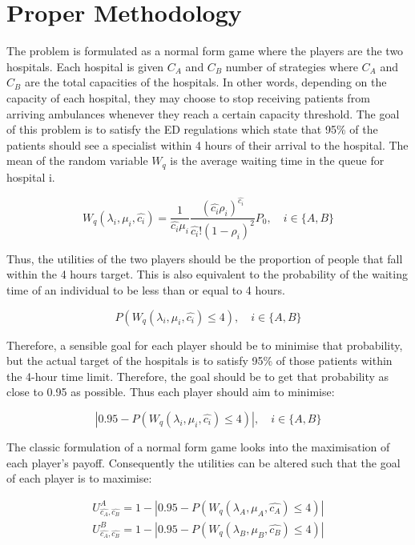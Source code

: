 \section{Proper Methodology}
The problem is formulated as a normal form game where the players are the two hospitals. 
Each hospital is given \( C_A \) and \( C_B \) number of strategies where \( C_A \) 
and \( C_B \) are the total capacities of the hospitals. 
In other words, depending on the capacity of each hospital, they may choose to stop 
receiving patients from arriving ambulances whenever they reach a certain capacity 
threshold. 
The goal of this problem is to satisfy the ED regulations which state that 95\% 
of the patients should see a specialist within 4 hours of their arrival to the hospital. 
The mean of the random variable \( W_q \) is the average waiting time in the queue 
for hospital i.


\begin{equation}
     W_q(\lambda_i, \mu_i, \hat{c_i}) = \frac{1}{\hat{c_i} \mu_i} 
     \frac{(\hat{c_i} \rho_i) ^ {\hat{c_i}}}{\hat{c_i}! (1 - \rho_i) ^ 2}P_0, 
     \quad i \in \{A,B\}
\end{equation}

Thus, the utilities of the two players should be the proportion of people that fall 
within the 4 hours target. 
This is also equivalent to the probability of the waiting time of an individual 
to be less than or equal to 4 hours. 

\begin{equation}
    P(W_q(\lambda_i, \mu_i, \hat{c_i}) \leq 4), \quad i \in \{A,B\}
\end{equation}

Therefore, a sensible goal for each player should be to minimise that probability, 
but the actual target of the hospitals is to satisfy 95\% of those patients within 
the 4-hour time limit. Therefore, the goal should be to get that probability as 
close to 0.95 as possible. 
Thus each player should aim to minimise:

\begin{equation}
    |0.95 - P(W_q(\lambda_i, \mu_i, \hat{c_i}) \leq 4)|, \quad i \in \{A,B\}
\end{equation}

The classic formulation of a normal form game looks into the maximisation of each 
player's payoff. 
Consequently the utilities can be altered such that the goal of each player is to 
maximise:

\begin{align}\label{Utilities}
    U_{\hat{c_A}, \hat{c_B}} ^ {A} = 1 - |0.95 - P(W_q(\lambda_A, \mu_A, \hat{c_A}) \leq 4)| \\
    U_{\hat{c_A}, \hat{c_B}} ^ {B} = 1 - |0.95 - P(W_q(\lambda_B, \mu_B, \hat{c_B}) \leq 4)|
\end{align}

